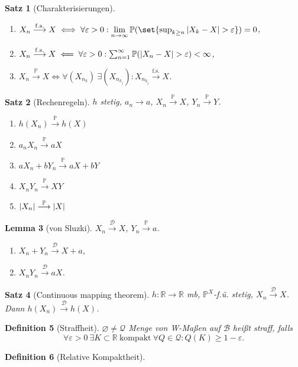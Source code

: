 \documentclass[a4paper,8pt]{article}
\newcounter{Sec}
\theoremstyle{nonumberbreak}
\newtheorem{definition}{Definition}[Sec]
\newtheorem{satz}[definition]{Satz}
\newtheorem{lemma}[definition]{Lemma}
\renewcommand{\P}{\mathbb{P}}
\newcommand{\R}{\mathbb{R}}
\newcommand{\sk}{\mathrel{\stackrel{\P}{\longrightarrow}}}
\newcommand{\fsk}{\mathrel{\stackrel{\operatorname{f.s.}}{\longrightarrow}}}
\newcommand{\vk}{\mathrel{\stackrel{\mathcal{D}}{\longrightarrow}}}
\begin{document}
\begin{multicols}{3}
\begin{satz}[Charakterisierungen]
		\begin{enumerate}[label=(\alph*)]
			\item $X_n \fsk X \iff \forall\varepsilon>0:\lim\limits_{n\to\infty}\P(\set{\sup_{k\geq n}\abs{X_k-X}>\varepsilon}) = 0$,
			\item $X_n \fsk X \impliedby\forall \varepsilon>0:\sum_{n=1}^\infty\P(\abs{X_n-X}>\varepsilon)<\infty$,\\
			\item $X_n \sk X \iff \forall (X_{n_k})~\exists (X_{n_{k_j}}): X_{n_{k_j}}\fsk X$.
		\end{enumerate}
	\end{satz}
	\begin{satz}[Rechenregeln]
		$h$ stetig, $a_n\to a$, $X_n\sk X$, $Y_n\sk Y$.
		{\setlength{\columnseprule}{0pt}\begin{multicols}{2}
		\begin{enumerate}[label=(\alph*)]
			\item $h(X_n)\sk h(X)$
			\item $a_nX_n\sk aX$
			\item $aX_n+bY_n\sk aX+bY$
			\item $X_nY_n\sk XY$
			\item $\abs{X_n}\sk\abs{X}$
		\end{enumerate}
		\end{multicols}}
	\end{satz}
	\begin{lemma}[von Sluzki]
		$X_n\vk X$, $Y_n\sk a$.
		{\setlength{\columnseprule}{0pt}\begin{multicols}{2}
		\begin{enumerate}[label=(\alph*)]
			\item $X_n+Y_n\vk X+a$,
			\item $X_nY_n\vk aX$.
		\end{enumerate}
		\end{multicols}}
	\end{lemma}
	\begin{satz}[Continuous mapping theorem]
		$h\colon\R\to\R$ mb, $\P^X$-f.ü. stetig, $X_n\vk X$. Dann $h(X_n)\vk h(X)$.
	\end{satz}
	\begin{definition}[Straffheit]
		$\varnothing\neq\mathcal{Q}$ Menge von W-Maßen auf $\mathcal{B}$ heißt straff, falls
		\[\forall\varepsilon>0~\exists K\subset\R~\text{kompakt}~\forall Q\in\mathcal{Q}:Q(K)\geq 1-\varepsilon.\]
	\end{definition}
	\begin{definition}[Relative Kompaktheit]

\end{definition}
\end{multicols}
\end{document}

